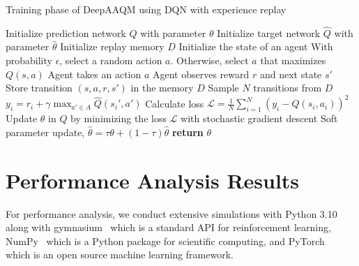 \documentclass[journal]{IEEEtran}
\begin{document}
\begin{algorithm}[ht!]
\caption{Training phase of DeepAAQM using DQN with experience replay}
\begin{algorithmic}[1]
    \State Initialize prediction network $Q$ with parameter $\theta$
    \State Initialize target network $\hat{Q}$ with parameter $\hat{\theta}$
    \State Initialize replay memory $D$
        \State Initialize the state of an agent
            \State With probability $\epsilon$, select a random action $a$. Otherwise, select $a$ that maximizes $Q(s, a)$
            \State Agent takes an action $a$
            \State Agent observes reward $r$ and next state $s'$
            \State Store transition $(s, a, r, s')$ in the memory $D$
                \State Sample $N$ transitions from $D$
                    \State $\displaystyle y_i = r_i + \gamma \max_{a' \in A} \hat{Q}(s_i',a')$
                \EndFor
                \State Calculate loss $\displaystyle \mathcal{L}=\frac{1}{N} \sum_{i=1}^{N}\left(y_i - Q(s_i,a_i)\right)^2$
                \State Update $\theta$ in $Q$ by minimizing the loss $\mathcal{L}$ with stochastic gradient descent
                \State Soft parameter update, $\hat{\theta} = \tau \theta + (1-\tau) \hat{\theta}$
            \EndIf
        \EndWhile
        \State \textbf{return} $\theta$
    \EndFor
\end{algorithmic}
\label{alg:alg1}
\end{algorithm}


\section{Performance Analysis Results}
\label{sec:performance}

For performance analysis, we conduct extensive simulations with Python 3.10 along with gymnasium~\cite{gym} which is a standard API for reinforcement learning, NumPy~\cite{numpy} which is a Python package for scientific computing, and PyTorch~\cite{torch} which is an open source machine learning framework. 
\end{document}
